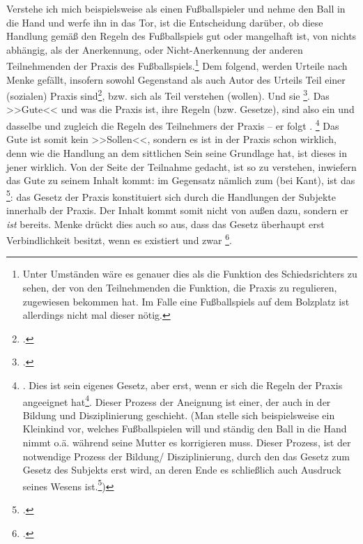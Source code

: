 \documentclass[12pt, a4paper, openany]{report}
\begin{document}
Verstehe ich mich beispielsweise als einen Fußballspieler und nehme den Ball in die Hand und werfe ihn in das Tor, ist die Entscheidung darüber, ob diese Handlung gemäß den Regeln des Fußballspiels gut oder mangelhaft ist, von nichts abhängig, als der Anerkennung, oder Nicht-Anerkennung der anderen Teilnehmenden der Praxis des Fußballspiels.\footnote{
    Unter Umständen wäre es genauer dies als die Funktion des Schiedsrichters zu sehen, der von den Teilnehmenden die Funktion, die Praxis zu regulieren, zugewiesen bekommen hat. 
    Im Falle eine Fußballspiels auf dem Bolzplatz ist allerdings nicht mal dieser nötig.
}
Dem folgend, werden Urteile nach Menke gefällt, insofern sowohl Gegenstand als auch Autor des Urteils Teil einer (sozialen) Praxis sind\footcite[Vgl.][28]{menke_autonomie_2018}, bzw. sich als Teil verstehen (wollen). 
Und sie \footcite[][S. 28 - S. 29]{menke_autonomie_2018}.
Das >>Gute<< und was die Praxis ist, ihre Regeln (bzw. Gesetze), sind also ein und dasselbe und zugleich die Regeln des Teilnehmers der Praxis -- er folgt .%
\footnote{
    \cite[][29]{menke_autonomie_2018}.
    Dies ist sein eigenes Gesetz, aber erst, wenn er sich die Regeln der Praxis angeeignet hat\footcite[Vgl.][32]{menke_autonomie_2018}.
    Dieser Prozess der Aneignung ist einer, der auch in der Bildung und Disziplinierung geschieht.
    (Man stelle sich beispielsweise ein Kleinkind vor, welches Fußballspielen will und ständig den Ball in die Hand nimmt o.ä. während seine Mutter es korrigieren muss. 
    Dieser Prozess, ist der notwendige Prozess der Bildung/ Disziplinierung, durch den das Gesetz zum Gesetz des Subjekts erst wird, an deren Ende es schließlich auch Ausdruck seines Wesens ist.\footcite[Vgl.][§ 147, S. 162]{hegel_grundlinien_2017})
}
Das Gute ist somit kein >>Sollen<<, sondern es ist in der Praxis schon wirklich, denn wie die Handlung an dem sittlichen Sein seine Grundlage hat, ist dieses in jener wirklich.
Von der Seite der Teilnahme gedacht, ist so zu verstehen, inwiefern das Gute zu seinem Inhalt kommt: 
im Gegensatz nämlich zum  (bei Kant), ist das \footcite[][§ 144, S. 161.]{hegel_grundlinien_2017}:
das Gesetz der Praxis konstituiert sich durch die Handlungen der Subjekte innerhalb der Praxis.
Der Inhalt kommt somit nicht von außen dazu, sondern er \emph{ist} bereits.
Menke drückt dies auch so aus, dass das Gesetz überhaupt erst Verbindlichkeit besitzt, wenn es existiert und zwar \footcite[][57]{menke_autonomie_2018}.
\end{document}
